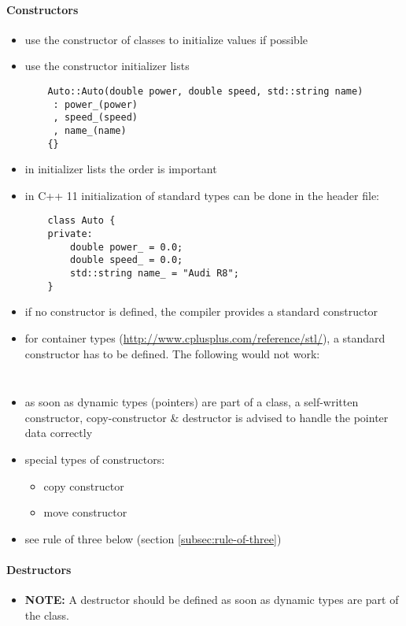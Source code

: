 \paragraph{Constructors}
\begin{itemize}

	\item use the constructor of classes to initialize values if possible
	\item use the constructor initializer lists
	\begin{verbatim}
	Auto::Auto(double power, double speed, std::string name)
	 : power_(power)
	 , speed_(speed)
	 , name_(name)
	{}
	\end{verbatim}
	
	\item in initializer lists the order is important
	\item in C++ 11 initialization of standard types can be done in the header file:
	\begin{verbatim}
	class Auto {
	private:
		double power_ = 0.0;
		double speed_ = 0.0;
		std::string name_ = "Audi R8";
	}
	\end{verbatim}
	
	\item if no constructor is defined, the compiler provides a standard constructor
	\item for container types (\url{http://www.cplusplus.com/reference/stl/}), a standard constructor has to be defined. The following would not work:
	
	\begin{minipage}[t]{0.4\textwidth}
		\inputminted{cpp}{src/constructors/ex-1/main.cpp}
	\end{minipage}\hfill
	\begin{minipage}[t]{0.4\textwidth}
		\inputminted{cpp}{src/constructors/ex-1/ConstructorClass.h}
	\end{minipage}

	\item as soon as dynamic types (pointers) are part of a class, a self-written constructor, copy-constructor \& destructor is advised to handle the pointer data correctly

	\item special types of constructors:
	\begin{itemize}
		\item copy constructor
		\item move constructor
	\end{itemize}

	\item see rule of three below (section \ref{subsec:rule-of-three})
\end{itemize}

\paragraph{Destructors}

\begin{itemize}
	\item 
	\begin{tcolorbox}[notitle,boxrule=0.5pt,colback=red!20,colframe=black!90]
		\textbf{NOTE:} A destructor should be defined as soon as dynamic types are part of the class. 
	\end{tcolorbox}
\end{itemize}